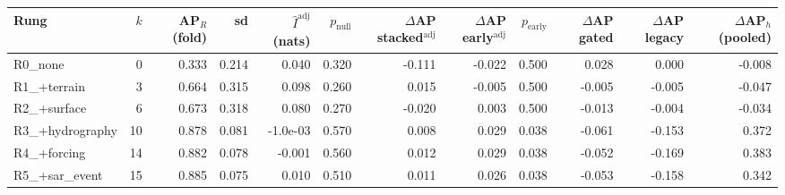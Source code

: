 \begin{tabular}{lrrrrrrrrrrr}
\toprule
Rung & $k$ & AP$_R$ (fold) & sd & $\hat I^{\mathrm{adj}}$ (nats) & $p_{\mathrm{null}}$ & $\Delta$AP stacked$^{\mathrm{adj}}$ & $\Delta$AP early$^{\mathrm{adj}}$ & $p_{\mathrm{early}}$ & $\Delta$AP gated & $\Delta$AP legacy & $\Delta$AP$_h$ (pooled) \\
\midrule
R0\_none & 0 & 0.333 & 0.214 & 0.040 & 0.320 & -0.111 & -0.022 & 0.500 & 0.028 & 0.000 & -0.008 \\
R1\_+terrain & 3 & 0.664 & 0.315 & 0.098 & 0.260 & 0.015 & -0.005 & 0.500 & -0.005 & -0.005 & -0.047 \\
R2\_+surface & 6 & 0.673 & 0.318 & 0.080 & 0.270 & -0.020 & 0.003 & 0.500 & -0.013 & -0.004 & -0.034 \\
R3\_+hydrography & 10 & 0.878 & 0.081 & -1.0e-03 & 0.570 & 0.008 & 0.029 & 0.038 & -0.061 & -0.153 & 0.372 \\
R4\_+forcing & 14 & 0.882 & 0.078 & -0.001 & 0.560 & 0.012 & 0.029 & 0.038 & -0.052 & -0.169 & 0.383 \\
R5\_+sar\_event & 15 & 0.885 & 0.075 & 0.010 & 0.510 & 0.011 & 0.026 & 0.038 & -0.053 & -0.158 & 0.342 \\
\bottomrule
\end{tabular}
